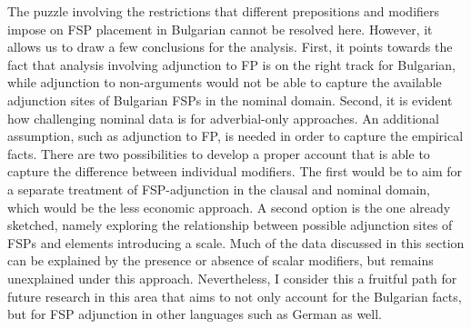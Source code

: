 \documentclass[output=paper,colorlinks,citecolor=brown]{langscibook}
\begin{document}
\ea\label{DPdata:4}
\label{DPdata:4a}
\label{DPdata:4b}
\label{DPdata:4c}
\label{DPdata:4d}
\label{DPdata:4e}
\label{DPdata:4f}
\z
\z 

\noindent The puzzle involving the restrictions that different prepositions and modifiers impose on FSP placement in Bulgarian cannot be resolved here. However, it allows us to draw a few conclusions for the analysis. First, it points towards the fact that  analysis involving adjunction to FP is on the right track for Bulgarian, while  adjunction to non-arguments would not be able to capture the available adjunction sites of Bulgarian FSPs in the nominal domain. Second, it is evident how challenging nominal data is for adverbial-only approaches. An additional assumption, such as adjunction to FP, is needed in order to capture the empirical facts. There are two possibilities to develop a proper account that is able to capture the difference between individual modifiers. The first would be to aim for a separate treatment of FSP-adjunction in the clausal and nominal domain, which would be the less economic approach. A second option is the one already sketched, namely exploring the relationship between possible adjunction sites of FSPs and elements introducing a scale. Much of the data discussed in this section can be explained by the presence or absence of scalar modifiers, but  remains unexplained under this approach. Nevertheless, I consider this a fruitful path for future research in this area that aims to not only account for the Bulgarian facts, but for FSP adjunction in other languages such as German as well. 
\end{document}

